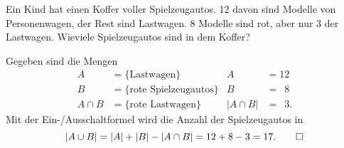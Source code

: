 Ein Kind hat einen Koffer voller Spielzeugautos.
12 davon sind Modelle von Personenwagen, der Rest sind Lastwagen.
8 Modelle sind rot, aber nur 3 der Lastwagen.
Wieviele Spielzeugautos sind in dem Koffer?

\begin{loesung}
Gegeben sind die Mengen
\begin{align*}
      A &= \{\text{Lastwagen}\}           &        A  &= 12          \\
      B &= \{\text{rote Spielzeugautos}\} &        B  &= \phantom{0}8\\
A\cap B &= \{\text{rote Lastwagen\}}      & |A\cap B| &= \phantom{0}3.
\end{align*}
Mit der Ein-/Ausschaltformel wird die Anzahl der Spielzeugautos in 
\[
|A\cup B|
=
|A| + |B| - |A\cap B|
=
12 + 8 - 3
=
17.
\qedhere
\]
\end{loesung}

